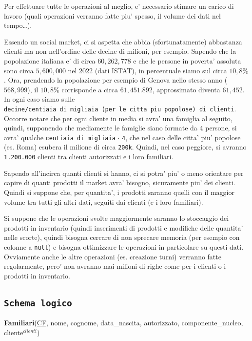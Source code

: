 \documentclass[]{article}
\begin{document}
Per effettuare tutte le operazioni al meglio, e' necessario stimare un
carico di lavoro (quali operazioni verranno fatte piu' spesso, il volume
dei dati nel tempo\ldots{}).

Essendo un social market, ci si aspetta che abbia (sfortunatamente)
abbastanza clienti ma non nell'ordine delle decine di milioni, per
esempio. Sapendo che la popolazione italiana e' di circa \(60,262,778\)
e che le persone in poverta' assoluta sono circa \(5,600,000\) nel 2022
(dati ISTAT), in percentuale siamo sul circa \(10,8\%\). Ora, prendendo
la popolazione per esempio di Genova nello stesso anno (\(568,999\)), il
\(10,8\%\) corrisponde a circa \(61,451.892\), approssimato diventa
\(61,452\). In ogni caso siamo sulle
\texttt{decine/centiaia\ di\ migliaia\ (per\ le\ citta\textquotesingle{}\ piu\textquotesingle{}\ popolose)\ di\ clienti}.
Occorre notare che per ogni cliente in media si avra' una famiglia al
seguito, quindi, supponendo che mediamente le famiglie siano formate da
\(4\) persone, si avra' qualche \texttt{centiaia\ di\ migliaia}
\(\cdot\) \texttt{4}, che nel caso delle citta' piu' popolose (es. Roma)
esubera il milione di circa \texttt{200k}. Quindi, nel caso peggiore, si
avranno \texttt{1.200.000} clienti tra clienti autorizzati e i loro
familiari.

Sapendo all'incirca quanti clienti si hanno, ci si potra' piu' o meno
orientare per capire di quanti prodotti il market avra' bisogno,
sicuramente piu' dei clienti. Quindi si suppone che, per quantita', i
prodotti saranno quelli con il maggior volume tra tutti gli altri dati,
seguiti dai clienti (e i loro familiari).

Si suppone che le operazioni svolte maggiormente saranno lo stoccaggio
dei prodotti in inventario (quindi inserimenti di prodotti e modifiche
delle quantita' nelle scorte), quindi bisogna cercare di non sprecare
memoria (per esempio con colonne a \texttt{null}) e bisogna ottimizzare
le operazioni in particolare su questi dati. Ovviamente anche le altre
operazioni (es. creazione turni) verranno fatte regolarmente, pero' non
avranno mai milioni di righe come per i clienti o i prodotti in
inventario.

\hypertarget{schema-logico}{%
\subsection{\texorpdfstring{\texttt{Schema\ logico}}{Schema logico}}\label{schema-logico}}

\textbf{Familiari}(\underline{CF}, nome, cognome, data\_nascita,
autorizzato, componente\_nucleo, cliente\(^{clienti}\))
\end{document}

